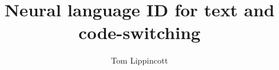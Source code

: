 \documentclass{beamer}
\title{Neural language ID for text and code-switching}
\author{Tom Lippincott}
\begin{document}
\begin{frame}
  \maketitle
\end{frame}
\end{document}
